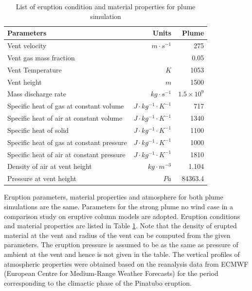 \begin{table}[htp]
	\centering
      \caption{List of eruption condition and material properties for plume simulation}		
	  \begin{tabular}{lrr}
	    \hline
	    Parameters & Units & Plume \\
	    \hline
	    Vent velocity          & $m\cdot s^{-1}$  & 275 \\
	    Vent gas mass fraction &                  & 0.05 \\
	    Vent Temperature       & $K$              & 1053 \\
	    Vent height            & $m$              & 1500 \\
	    Mass discharge rate    & $kg\cdot s^{-1}$ & $1.5 \times 10^9$\\
	    	Specific heat of gas at constant volume     & $J \cdot kg^{-1}\cdot K^{-1}$ & 717     \\
	    Specific heat of air at constant volume     & $J \cdot kg^{-1}\cdot K^{-1}$ & 1340    \\
	    	Specific heat of solid                      & $J \cdot kg^{-1}\cdot K^{-1}$ & 1100    \\
	    	Specific heat of gas at constant pressure   & $J \cdot kg^{-1}\cdot K^{-1}$ & 1000    \\
	    	Specific heat of air at constant pressure   & $J \cdot kg^{-1}\cdot K^{-1}$ & 1810    \\
	    	Density of air at vent height               & $kg \cdot m^{-3}$       & 1.104   \\
	    Pressure at vent height                     & $Pa$                    & 84363.4 \\
	    \hline
	  \end{tabular}
	  \label{tab:input_parameters_plume_simulation}
\end{table}

Eruption parameters, material properties and atmosphere for both plume simulations are the same. Parameters for the strong plume no wind case in a comparison study on eruptive column models \citep {costa2016results} are adopted. Eruption conditions and material properties are listed in Table \ref{tab:input_parameters_plume_simulation}. Note that the density of erupted material at the vent and radius of the vent can be computed from the given parameters. The eruption pressure is assumed to be as the same as pressure of ambient at the vent and hence is not given in the table. The vertical profiles of atmospheric properties were obtained based on the reanalysis data from ECMWF (European Centre for Medium-Range Weather Forecasts) for the period corresponding to the climactic phase of the Pinatubo eruption.

